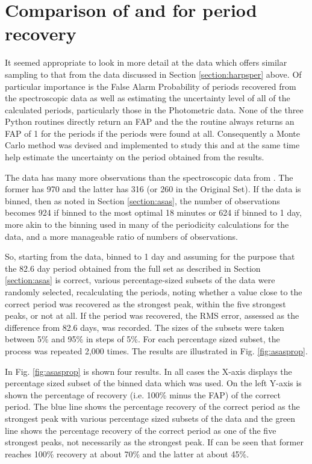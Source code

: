 \section{Comparison of {\asas} and {\harps} for period recovery}
\protect\label{section:asasfap}

It seemed appropriate to look in more detail at the {\asas} data which offers similar sampling to that from the {\harps}
data discussed in Section \ref{section:harpsper} above. Of particular importance is the False Alarm Probability of
periods recovered from the spectroscopic data as well as estimating the uncertainty level of all of the calculated
periods, particularly those in the Photometric data. None of the three Python routines directly return an FAP and the
the {\numrecs} routine always returns an FAP of 1 for the periods if the periods were found at all. Consequently a Monte
Carlo method was devised and implemented to study this and at the same time help estimate the uncertainty on the period
obtained from the {\asas} results.

The {\asas} data has many more observations than the spectroscopic data from {\harps}. The former has 970 and the latter
has 316 (or 260 in the Original Set). If the {\asas} data is binned, then as noted in Section \ref{section:asas}, the
number of observations becomes 924 if binned to the most optimal 18 minutes or 624 if binned to 1 day, more akin to the
binning used in many of the periodicity calculations for the {\harps} data, and a more manageable ratio of numbers of
observations.

So, starting from the {\asas} data, binned to 1 day and assuming for the purpose that the 82.6 day period obtained from
the full set as described in Section \ref{section:asas} is correct, various percentage-sized subsets of the data were
randomly selected, recalculating the periods, noting whether a value close to the correct period was recovered as the
strongest peak, within the five strongest peaks, or not at all. If the period was recovered, the RMS error, assessed as
the difference from 82.6 days, was recorded. The sizes of the subsets were taken between 5\% and 95\% in steps of
5\%. For each percentage sized subset, the process was repeated 2,000 times. The results are illustrated in
Fig. \ref{fig:asasprop}.

In Fig. \ref{fig:asasprop} is shown four results. In all cases the X-axis displays the percentage sized subset of the
binned {\asas} data which was used. On the left Y-axis is shown the percentage of recovery (i.e. 100\% minus the FAP) of
the correct period. The blue line shows the percentage recovery of the correct period as the strongest peak with various
percentage sized subsets of the data and the green line shows the percentage recovery of the correct period as one of
the five strongest peaks, not necessarily as the strongest peak. If can be seen that former reaches 100\% recovery at
about 70\% and the latter at about 45\%.

